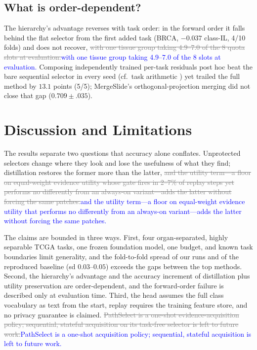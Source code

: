 \documentclass{article}
\newif\ifmarkup \markuptrue
\newcommand{\del}[1]{\ifmarkup\textcolor{gray}{\sout{#1}}\fi}
\newcommand{\ins}[1]{\ifmarkup\textcolor{blue}{#1}\else#1\fi}
\newcommand{\rep}[2]{\del{#1}\ins{#2}}
\begin{document}
\subsection{What is order-dependent?}
\label{ssec:order}

The hierarchy's advantage reverses with task order: in the forward order it falls behind the flat selector from the first added task (BRCA, $-0.037$ class-IL, 4/10 folds) and does not recover, \rep{with one tissue group taking 4.9--7.0 of the 8 quota slots at evaluation.}{with one tissue group taking 4.9--7.0 of the 8 slots at evaluation.} Composing independently trained per-task residuals post hoc beat the bare sequential selector in every seed (cf.\ task arithmetic \cite{ilharco2023task}) yet trailed the full method by $13.1$ points (5/5); MergeSlide's orthogonal-projection merging \cite{bui2026mergeslide} did not close that gap ($0.709{\pm}.035$).

\FloatBarrier
\section{Discussion and Limitations}
\label{sec:discussion}

The results separate two questions that accuracy alone conflates. Unprotected selectors change where they look and lose the usefulness of what they find; distillation restores the former more than the latter, \rep{and the utility term---a floor on equal-weight evidence utility whose gate fires in 2--7\% of replay steps yet performs no differently from an always-on variant---adds the latter without forcing the same patches.}{and the utility term---a floor on equal-weight evidence utility that performs no differently from an always-on variant---adds the latter without forcing the same patches.}

The claims are bounded in three ways. First, four organ-separated, highly separable TCGA tasks, one frozen foundation model, one budget, and known task boundaries limit generality, and the fold-to-fold spread of our runs and of the reproduced baseline (sd $0.03$--$0.05$) exceeds the gaps between the top methods. Second, the hierarchy's advantage and the accuracy increment of distillation plus utility preservation are order-dependent, and the forward-order failure is described only at evaluation time. Third, the head assumes the full class vocabulary as text from the start, replay requires the training feature store, and no privacy guarantee is claimed. \rep{PathSelect is a one-shot evidence-acquisition policy; sequential, stateful acquisition on its task-free selector is left to future work.}{PathSelect is a one-shot acquisition policy; sequential, stateful acquisition is left to future work.}
\end{document}
